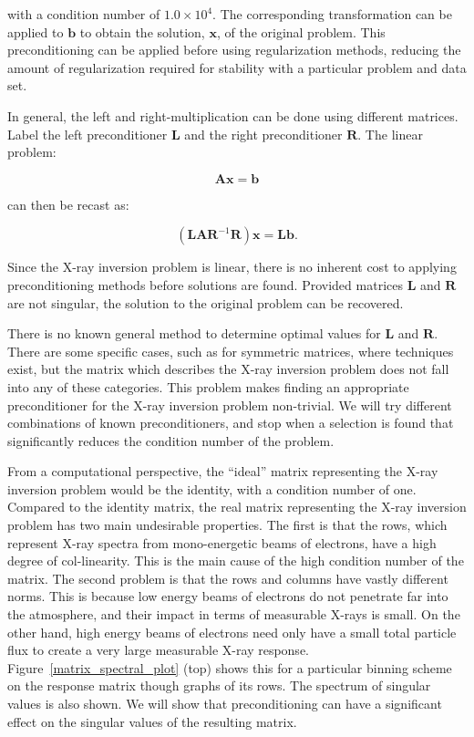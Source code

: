 with a condition number of $1.0\times10^{4}$. The corresponding transformation can be applied to $\mathbf{b}$ to obtain the solution, $\mathbf{x}$, of the original problem. This preconditioning can be applied before using regularization methods, reducing the amount of regularization required for stability with a  particular problem and data set. 

In general, the left and right-multiplication can be done using different matrices. Label the left preconditioner $\mathbf{L}$ and the right preconditioner $\mathbf{R}$. The linear problem:

$$\mathbf{A}\mathbf{x} = \mathbf{b}$$

can then be recast as:

$$(\mathbf{L}\mathbf{A}\mathbf{R}^{-1}\mathbf{R})\mathbf{x} = \mathbf{L}\mathbf{b}.$$

Since the X-ray inversion problem is linear, there is no inherent cost to applying preconditioning methods before solutions are found. Provided matrices $\mathbf{L}$ and $\mathbf{R}$ are not singular, the solution to the original problem can be recovered. 

There is no known general method to determine optimal values for $\mathbf{L}$ and $\mathbf{R}$. There are some specific cases, such as for symmetric matrices, where techniques exist, but the matrix which describes the X-ray inversion problem does not fall into any of these categories. This problem makes finding an appropriate preconditioner for the X-ray inversion problem non-trivial. We will try different combinations of known preconditioners, and stop when a selection is found that significantly reduces the condition number of the problem. 

From a computational perspective, the ``ideal'' matrix representing the X-ray inversion problem would be the identity, with a condition number of one. Compared to the identity matrix, the real matrix representing the X-ray inversion problem has two main undesirable properties. The first is that the rows, which represent X-ray spectra from mono-energetic beams of electrons, have a high degree of col-linearity. This is the main cause of the high condition number of the matrix. The second problem is that the rows and columns have vastly different norms. This is because low energy beams of electrons do not penetrate far into the atmosphere, and their impact in terms of measurable X-rays is small. On the other hand, high energy beams of electrons need only have a small total particle flux to create a very large measurable X-ray response. Figure~\ref{matrix_spectral_plot} (top) shows this for a particular binning scheme on the response matrix though graphs of its rows. The spectrum of singular values is also shown. We will show that preconditioning can have a significant effect on the singular values of the resulting matrix. 

